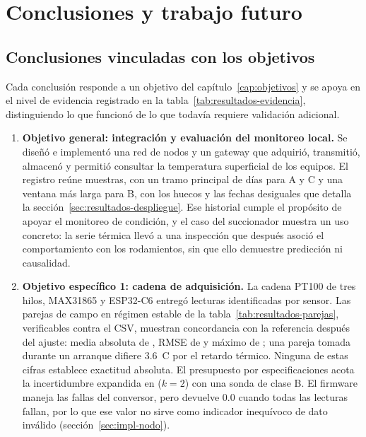 \chapter{Conclusiones y trabajo futuro}
\label{cap:conclusiones}

\section{Conclusiones vinculadas con los objetivos}
Cada conclusión responde a un objetivo del capítulo~\ref{cap:objetivos} y se apoya en el nivel de evidencia registrado en la tabla~\ref{tab:resultados-evidencia}, distinguiendo lo que funcionó de lo que todavía requiere validación adicional.

\begin{enumerate}
\item \textbf{Objetivo general: integración y evaluación del monitoreo local.} Se diseñó e implementó una red de \NumeroNodos{} nodos y un gateway que adquirió, transmitió, almacenó y permitió consultar la temperatura superficial de los equipos. El registro reúne \TotalMuestras{} muestras, con un tramo principal de \DuracionComunDias{} días para A y C y una ventana más larga para B, con los huecos y las fechas desiguales que detalla la sección~\ref{sec:resultados-despliegue}. Ese historial cumple el propósito de apoyar el monitoreo de condición, y el caso del succionador muestra un uso concreto: la serie térmica llevó a una inspección que después asoció el comportamiento con los rodamientos, sin que ello demuestre predicción ni causalidad.

\item \textbf{Objetivo específico 1: cadena de adquisición.} La cadena PT100 de tres hilos, MAX31865 y ESP32-C6 entregó lecturas identificadas por sensor. Las \NumeroParejas{} parejas de campo en régimen estable de la tabla~\ref{tab:resultados-parejas}, verificables contra el CSV, muestran concordancia con la referencia después del ajuste: media absoluta de \DiferenciaTermicaMedia{}, RMSE de \RMSETermico{} y máximo de \DiferenciaTermicaMaxima{}; una pareja tomada durante un arranque difiere 3.6~\textdegree C por el retardo térmico. Ninguna de estas cifras establece exactitud absoluta. El presupuesto por especificaciones acota la incertidumbre expandida en \IncertidumbreTipoB{} ($k=2$) con una sonda de clase B. El firmware maneja las fallas del conversor, pero devuelve 0.0 cuando todas las lecturas fallan, por lo que ese valor no sirve como indicador inequívoco de dato inválido (sección~\ref{sec:impl-nodo}).


\end{enumerate}
